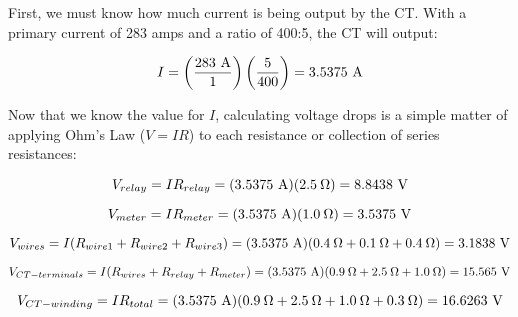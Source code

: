 





 






First, we must know how much current is being output by the CT.  With a primary current of 283 amps and a ratio of 400:5, the CT will output:

$$I = \left({283 \hbox{ A} \over 1} \right) \left({5 \over 400} \right) = 3.5375 \hbox{ A}$$

Now that we know the value for $I$, calculating voltage drops is a simple matter of applying Ohm's Law ($V = IR$) to each resistance or collection of series resistances:

$$V_{relay} = I R_{relay} = (3.5375 \hbox{ A})(2.5 \> \Omega) = 8.8438 \hbox{ V}$$

$$V_{meter} = I R_{meter} = (3.5375 \hbox{ A})(1.0 \> \Omega) = 3.5375 \hbox{ V}$$

$$V_{wires} = I (R_{wire1} + R_{wire2} + R_{wire3}) = (3.5375 \hbox{ A})(0.4 \> \Omega + 0.1 \> \Omega + 0.4 \> \Omega) = 3.1838 \hbox{ V}$$

$$V_{CT-terminals} = I (R_{wires} + R_{relay} + R_{meter}) = (3.5375 \hbox{ A})(0.9 \> \Omega + 2.5 \> \Omega + 1.0 \> \Omega) = 15.565 \hbox{ V}$$

$$V_{CT-winding} = I R_{total} = (3.5375 \hbox{ A})(0.9 \> \Omega + 2.5 \> \Omega + 1.0 \> \Omega + 0.3 \> \Omega) = 16.6263 \hbox{ V}$$





